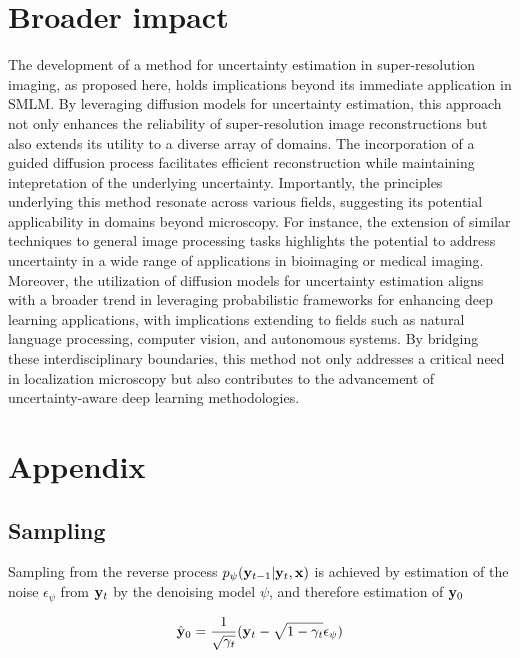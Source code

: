 \section{Broader impact}

The development of a method for uncertainty estimation in super-resolution imaging, as proposed here, holds implications beyond its immediate application in SMLM. By leveraging diffusion models for uncertainty estimation, this approach not only enhances the reliability of super-resolution image reconstructions but also extends its utility to a diverse array of domains. The incorporation of a guided diffusion process facilitates efficient reconstruction while maintaining intepretation of the underlying uncertainty. Importantly, the principles underlying this method resonate across various fields, suggesting its potential applicability in domains beyond microscopy. For instance, the extension of similar techniques to general image processing tasks highlights the potential to address uncertainty in a wide range of applications in bioimaging or medical imaging. Moreover, the utilization of diffusion models for uncertainty estimation aligns with a broader trend in leveraging probabilistic frameworks for enhancing deep learning applications, with implications extending to fields such as natural language processing, computer vision, and autonomous systems. By bridging these interdisciplinary boundaries, this method not only addresses a critical need in localization microscopy but also contributes to the advancement of uncertainty-aware deep learning methodologies.


\section{Appendix}

\subsection{Sampling}

Sampling from the reverse process $p_{\psi}(\bold{y}_{t-1}\lvert\bold{y}_{t},\bold{x})$ is achieved by estimation of the noise $\epsilon_{\psi}$ from $\bold{y}_{t}$ by the denoising model $\psi$, and therefore estimation of $\bold{y}_{0}$

\begin{equation}
\hat{\bold{y}}_{0} = \frac{1}{\sqrt{\gamma_{t}}}(\bold{y}_{t} - \sqrt{1-\gamma_{t}}\epsilon_{\psi})
\end{equation}

